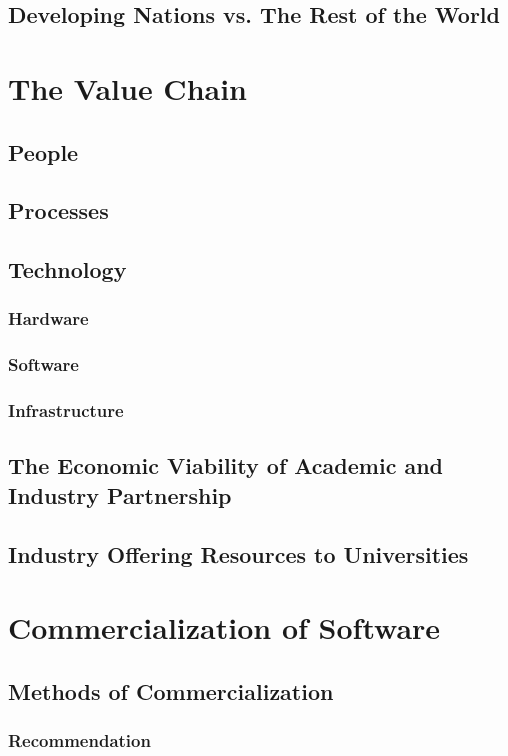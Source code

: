 \subsection{Developing Nations vs. The Rest of the World}
\section{The Value Chain}
\subsection{People}
\subsection{Processes}
\subsection{Technology}
\subsubsection{Hardware}
\subsubsection{Software}
\subsubsection{Infrastructure}
\subsection{The Economic Viability of Academic and Industry Partnership}
\subsection{Industry Offering Resources to Universities}
\section{Commercialization of Software}
\subsection{Methods of Commercialization}
\subsubsection{Recommendation}
